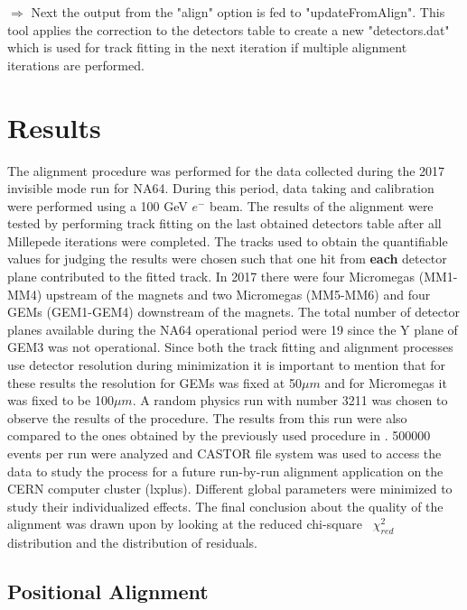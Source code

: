 \begin{description}
    \item $\Rightarrow$ Next the output from the "align" option is fed to "updateFromAlign". This tool applies the correction to the detectors table to create a new "detectors.dat" which is used for track fitting in the next iteration if multiple alignment iterations are performed.
\end{description}


\section{Results}
The alignment procedure was performed for the data collected during the 2017 invisible mode run for NA64. During this period, data taking and calibration were performed using a 100 GeV $e^-$ beam. The results of the alignment were tested by performing track fitting on the last obtained detectors table after all Millepede iterations were completed. The tracks used to obtain the quantifiable values for judging the results were chosen such that one hit from \textbf{each} detector plane contributed to the fitted track. In 2017 there were four Micromegas (MM1-MM4) upstream of the magnets and two Micromegas (MM5-MM6) and four GEMs (GEM1-GEM4) downstream of the magnets. The total number of detector planes available during the NA64 operational period were 19 since the Y plane of GEM3 was not operational. Since both the track fitting and alignment processes use detector resolution during minimization it is important to mention that for these results the resolution for GEMs was fixed at 50$\mu m$ and for Micromegas it was fixed to be 100$\mu m$. A random physics run with number 3211 was chosen to observe the results of the procedure. The results from this run were also compared to the ones obtained by the previously used procedure in \cite{nabeel:2018}. 500000 events per run were analyzed and CASTOR file system was used to access the data to study the process for a future run-by-run alignment application on the CERN computer cluster (lxplus). Different global parameters were minimized to study their individualized effects. The final conclusion about the quality of the alignment was drawn upon by looking at the reduced chi-square~ $\chi^2_{red}$ distribution and the distribution of residuals.

\subsection[Positional Alignment]%
{Positional Alignment} %

